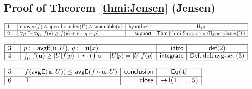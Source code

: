 \documentclass[11pt,reqno]{amsart}
\begin{document}
	\subsection*{Proof of Theorem \protect\ref{thmi:Jensen} (\textsf{Jensen})}
	\noindent$\begin{array}{|m{0.5cm}|l|r|c|}
	\hline
	1 & \mathsf{convex}(f)\wedge\mathsf{open\ bounded}(U)\wedge\mathsf{summable}(\mathbf{u}) & \mathsf{hypothesis} & \mathsf{Hyp} \\ \hline
	2 & \forall p\;\exists r\;\forall q,\;f(q)\ge f(p)+r\cdot(q-p) & \mathsf{support} & \textsf{Thm:}\ref{thmi:SupportingHyperplanes}(1) \\ \hline
	\end{array}$
	\par\nointerlineskip\noindent$\begin{array}{|m{0.5cm}|l|r|c|}
	\hline
	3 & p:=\mathsf{avgE}(\mathbf{u},U),\;q:=\mathbf{u}(x) & \mathsf{intro} & \mathsf{def}(2) \\ \hline
	4 & \int_{U}f(\mathbf{u})\ge|U|f(p)+r\cdot(\int\mathbf{u}-|U|p)=|U|f(p) & \mathsf{integrate} & \textsf{Def:}\ref{defi:avg-set}(3) \\ \hline
	\end{array}$
	\par\nointerlineskip\noindent$\begin{array}{|m{0.5cm}|l|r|c|}
	\hline
	5 & f(\mathsf{avgE}(\mathbf{u},U))\le\mathsf{avgE}(f\circ\mathbf{u},U) & \mathsf{conclusion} & \mathsf{Eq}(4) \\ \hline
	6 & \top & \mathsf{close} & \to\mathsf{I}(1,\dots,5) \\ \hline
	\end{array}$
	\medskip
	
\end{document}
